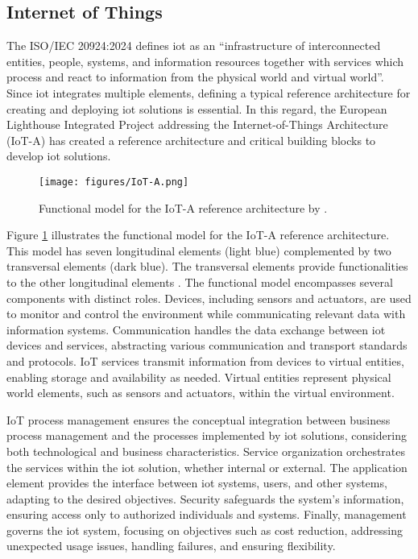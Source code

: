 \documentclass[preprint, review, 12pt]{elsarticle}
\begin{document}
\subsection{Internet of Things}

The ISO/IEC 20924:2024 \cite{iso20924} defines \gls{iot} as an ``infrastructure of interconnected entities, people, systems, and information resources together with services which process and react to information from the physical world and virtual world''. Since \gls{iot} integrates multiple elements, defining a typical reference architecture for creating and deploying \gls{iot} solutions is essential. In this regard, the European Lighthouse Integrated Project addressing the Internet-of-Things Architecture (IoT-A) \cite{bassi2013} has created a reference architecture and critical building blocks to develop \gls{iot} solutions. 

\begin{figure}[htbp]
    \centering
    \texttt{[image: figures/IoT-A.png]}
    \caption{Functional model for the IoT-A reference architecture by \cite{bassi2013}.}
    \label{fig:IoT-A}
\end{figure}

Figure \ref{fig:IoT-A} illustrates the functional model for the IoT-A reference architecture. This model has seven longitudinal elements (light blue) complemented by two transversal elements (dark blue). The transversal elements provide functionalities to the other longitudinal elements \cite{bassi2013}. The functional model encompasses several components with distinct roles. Devices, including sensors and actuators, are used to monitor and control the environment while communicating relevant data with information systems. Communication handles the data exchange between \gls{iot} devices and services, abstracting various communication and transport standards and protocols. IoT services transmit information from devices to virtual entities, enabling storage and availability as needed. Virtual entities represent physical world elements, such as sensors and actuators, within the virtual environment.

IoT process management ensures the conceptual integration between business process management and the processes implemented by \gls{iot} solutions, considering both technological and business characteristics. Service organization orchestrates the services within the \gls{iot} solution, whether internal or external. The application element provides the interface between \gls{iot} systems, users, and other systems, adapting to the desired objectives. Security safeguards the system's information, ensuring access only to authorized individuals and systems. Finally, management governs the \gls{iot} system, focusing on objectives such as cost reduction, addressing unexpected usage issues, handling failures, and ensuring flexibility.
\end{document}
